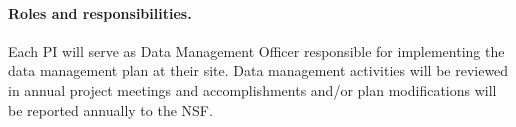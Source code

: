 \paragraph*{Roles and responsibilities.}
Each PI %
will serve as Data Management
Officer responsible for implementing the data management plan at their
site. Data management activities will be reviewed in annual project
meetings and accomplishments and/or plan modifications will be
reported annually to the NSF\@.
